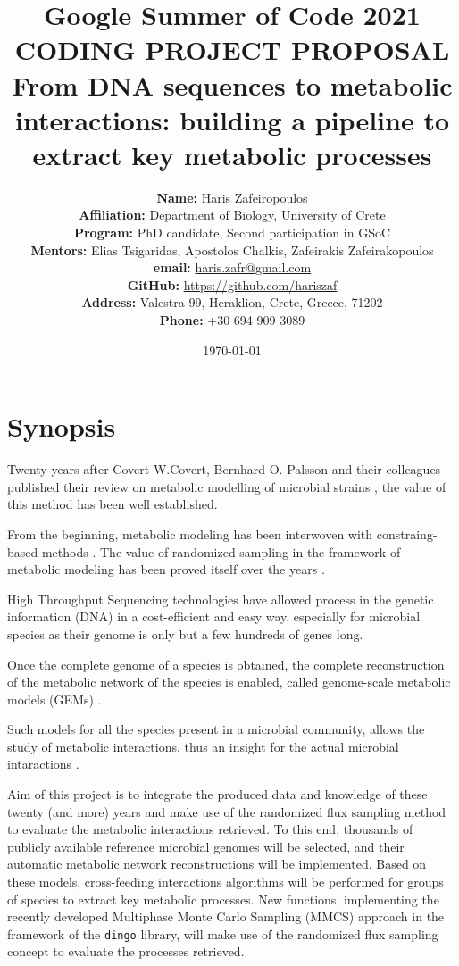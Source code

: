 \documentclass{article}
\title{Google Summer of Code 2021 \\ CODING PROJECT PROPOSAL \\ From DNA sequences to metabolic interactions: building a pipeline to extract key metabolic processes}
\author{
   \textbf{Name:} {Haris Zafeiropoulos} \\
   \textbf{Affiliation:} Department of Biology, University of Crete \\
   \textbf{Program:} PhD candidate, Second participation in GSoC \\
   \textbf{Mentors:} Elias Tsigaridas, Apostolos Chalkis, Zafeirakis Zafeirakopoulos \\
   \textbf{email:} \href{mailto:haris.zafr@gmail.com}{haris.zafr@gmail.com}\\
   \textbf{GitHub:} \href{https://github.com/hariszaf}{https://github.com/hariszaf}\\
   \textbf{Address:} Valestra 99, Heraklion, Crete, Greece, 71202\\
   \textbf{Phone:} +30 694 909 3089
}
\date{\today}
\begin{document}
\maketitle
\tableofcontents



\section{Synopsis}

Twenty years after Covert W.Covert, Bernhard O. Palsson and their colleagues published 
their review on metabolic modelling of microbial strains \cite{covert2001metabolic}, 
the value of this method has been well established. 

From the beginning, metabolic modeling has been interwoven with constraing-based methods \cite{palsson2015systems}. The value of randomized sampling in the framework of metabolic modeling has been proved itself over the years \cite{schellenberger2009use, herrmann2019flux}.

High Throughput Sequencing technologies have allowed process in the genetic information (DNA) in a cost-efficient and easy way, especially for microbial species as their genome is only but a few hundreds of genes long.

Once the complete genome of a species is obtained, the complete reconstruction of the metabolic network of the species is enabled, called genome-scale metabolic models (GEMs) \cite{gu2019current}.

Such models for all the species present in a microbial community, allows the study 
of metabolic interactions, thus an insight for the actual microbial intaractions \cite{ponomarova2015metabolic}. 

Aim of this project is to integrate the produced data and knowledge of these twenty 
(and more) years and make use of the randomized flux sampling method 
to evaluate the metabolic interactions retrieved. 
To this end, thousands of publicly available reference microbial genomes will be 
selected, and their automatic metabolic network reconstructions will be implemented. 
Based on these models, cross-feeding interactions algorithms will be performed for groups
of species to extract key metabolic processes. 
New functions, implementing the recently developed Multiphase Monte Carlo Sampling (MMCS) approach \cite{chalkis2020geometric} in the framework  of the \texttt{dingo} library, will 
make use of the randomized flux sampling concept to evaluate the processes retrieved.
\end{document}
